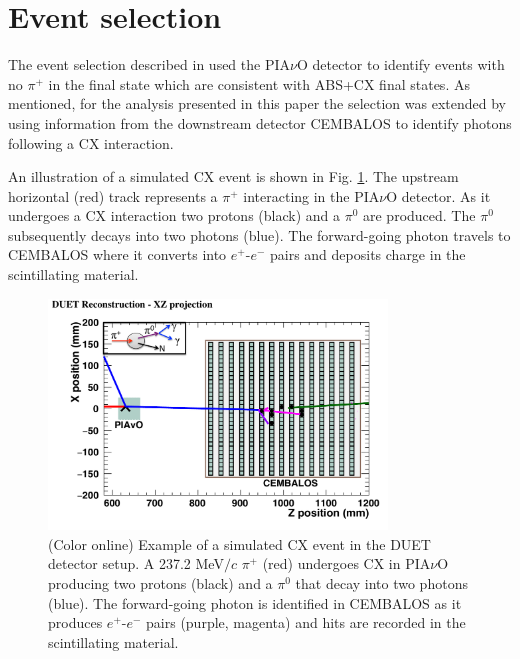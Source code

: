 \section{\label{sec:selection}Event selection}
The event selection described in \cite{duet} used the PIA$\nu$O detector to identify events with no $\pi^{+}$ in the final state which are consistent with ABS+CX final states. As mentioned, for the analysis presented in this paper the selection was extended by using information from the downstream detector CEMBALOS to identify photons following a CX interaction. 

An illustration of a simulated CX event is shown in Fig. \ref{fig:event}. The upstream horizontal (red) track represents a $\pi^{+}$ interacting in the PIA$\nu$O detector. As it undergoes a CX interaction two protons (black) and a $\pi^{0}$ are produced. The $\pi^{0}$ subsequently decays into two photons (blue). The forward-going photon travels to CEMBALOS where it converts into $e^{+}$-$e^{-}$ pairs and deposits charge in the scintillating material.

\begin{figure}[ht]
\includegraphics[width=90mm]{figures/event_display_with_diagram.pdf}
\caption{(Color online) Example of a simulated CX event in the DUET detector setup. A 237.2 MeV$/c$ $\pi^+$ (red) undergoes CX in PIA$\nu$O producing two protons (black) and a $\pi^0$ that decay into two photons (blue). The forward-going photon is identified in CEMBALOS as it produces $e^{+}$-$e^{-}$ pairs (purple, magenta) and hits are recorded in the scintillating material.}
\label{fig:event}
\end{figure}

